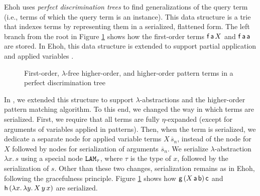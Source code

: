 Ehoh uses \emph{perfect discrimination trees} \cite{mcc-92-pdts} to find
generalizations of the query term (i.e., terms of which the query term is an instance).
This data structure is a trie
that indexes terms by representing them in a serialized, flattened form.
The left branch from the root in Figure \ref{fig:pdt} shows how the first-order terms
$\mathsf{f}\, \mathsf{a} \, X$ and $\mathsf{f}\, \mathsf{a} \, \mathsf{a}$ are stored.
In Ehoh, this data structure is extended to support partial application
and applied variables \cite{section-ehoh}.

\begin{figure}[tb]
\centering
{}
\caption{First-order, $\lambda$-free higher-order, and higher-order pattern
  terms in a perfect discrimination tree}
\label{fig:pdt}
\end{figure}

In \ehohii{}, we extended this structure to support $\lambda$-abstractions and
the higher-order pattern matching algorithm.
To this end, we changed the way in which terms are
serialized. First, we require that all terms are fully $\eta$-expanded (except
for arguments of variables applied in patterns). Then, when the term is serialized,
we dedicate a separate node for applied variable terms $X \, \overline{s}_n$,
instead of the node for $X$ followed by nodes for serialization of arguments
$\overline{s}_n$. We serialize $\lambda$-abstraction $\lambda x.\, s$ using
a special node $\texttt{LAM}_\tau$, where $\tau$ is the type of $x$,
followed by the serialization of $s$. Other than these two changes, serialization
remains as in Ehoh, following the gracefulness principle.
Figure \ref{fig:pdt} shows how $\mathsf{g} \,
(X\,\mathsf{a}\,\mathsf{b}) \, \mathsf{c}$ and $\mathsf{h} \, (\lambda x. \, \lambda y. \, X
\, y \, x)$ are serialized.

